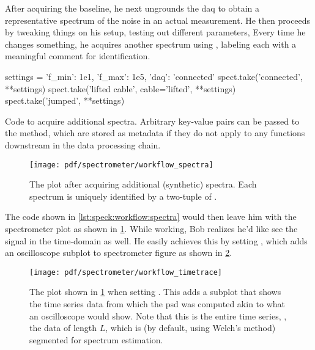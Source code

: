After acquiring the baseline, he next ungrounds the \gls{daq} to obtain a representative spectrum of the noise in an actual measurement.
He then proceeds by tweaking things on his setup, testing out different parameters, \etc
Every time he changes something, he acquires another spectrum using , labeling each with a meaningful comment for identification.
\begin{listing}[H]
    \begin{py}
        settings = {'f_min': 1e1, 'f_max': 1e5, 'daq': 'connected'}
        spect.take('connected', **settings)
        spect.take('lifted cable', cable='lifted', **settings)
        spect.take('jumped', **settings)
    \end{py}
    \caption[]{
        Code to acquire additional spectra.
        Arbitrary key-value pairs can be passed to the  method, which are stored as metadata if they do not apply to any functions downstream in the data processing chain.
    }
    \label{lst:speck:workflow:spectra}
\end{listing}
\begin{figure}
    \centering
    \texttt{[image: pdf/spectrometer/workflow\_spectra]}
    \caption{
        The \pyspeck plot after acquiring additional (synthetic) spectra.
        Each spectrum is uniquely identified by a two-tuple of .
    }
    \label{fig:speck:software:workflow:spectra}
\end{figure}
The code shown in \cref{lst:speck:workflow:spectra} would then leave him with the spectrometer plot as shown in \cref{fig:speck:software:workflow:spectra}.
While working, Bob realizes he'd like see the signal in the time-domain as well.
He easily achieves this by setting , which adds an oscilloscope subplot to spectrometer figure as shown in \cref{fig:speck:software:workflow:timetrace}.

\begin{figure}
    \centering
    \texttt{[image: pdf/spectrometer/workflow\_timetrace]}
    \caption{
        The \pyspeck plot shown in \cref{fig:speck:software:workflow:spectra} when setting .
        This adds a subplot that shows the time series data from which the \gls{psd} was computed akin to what an oscilloscope would show.
        Note that this is the entire time series, \ie, the data of length $L$, which is (by default, using Welch's method) segmented for spectrum estimation.
    }
    \label{fig:speck:software:workflow:timetrace}
\end{figure}

